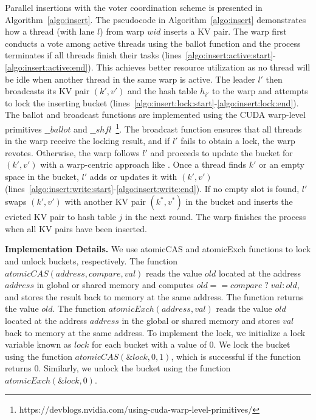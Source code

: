 Parallel insertions with the voter coordination scheme is presented in Algorithm~\ref{algo:insert}.
The pseudocode in Algorithm~\ref{algo:insert} demonstrates how a thread (with lane $l$) from warp $wid$ inserts a KV pair. 
The warp first conducts a vote among active threads using the ballot function and the process terminates if all threads finish their tasks (lines~\ref{algo:insert:active:start}-\ref{algo:insert:active:end}).  
This achieves better resource utilization as no thread will be idle when another thread in the same warp is active.  
The leader $l'$ then broadcasts its KV pair $(k',v')$ and the hash table $h_{i'}$ to the warp and attempts to lock the inserting bucket (lines~\ref{algo:insert:lock:start}-\ref{algo:insert:lock:end}). 
The ballot and broadcast functions are implemented using the CUDA warp-level primitives $\_\_ballot$ and $\_\_shfl$~\footnote{https://devblogs.nvidia.com/using-cuda-warp-level-primitives/}.
The broadcast function ensures that all threads in the warp receive the locking result, and if $l'$ fails to obtain a lock, the warp revotes.
Otherwise, the warp follows $l'$ and proceeds to update the bucket for $(k',v')$ with a warp-centric approach like .
Once a thread finds $k'$ or an empty space in the bucket, $l'$ adds or updates it with $(k',v')$ (lines~\ref{algo:insert:write:start}-\ref{algo:insert:write:end}).
If no empty slot is found, $l'$ swaps $(k',v')$ with another KV pair $(k^*,v^*)$ in the bucket and inserts the evicted KV pair to hash table $j$ in the next round. 
The warp finishes the process when all KV pairs have been inserted.

\vspace{1mm}
\noindent\textbf{Implementation Details.} We use atomicCAS and atomicExch functions to lock and unlock buckets, respectively.
The function $atomicCAS(address,compare,val)$ reads the value $old$ located at the address $address$ in global or shared memory and computes $old == compare \;?\; val : old$, and stores the result back to memory at the same address. The function returns the value $old$. The function $atomicExch(address,val)$ reads the value $old$ located at the address $address$ in the global or shared memory and stores $val$ back to memory at the same address. 
To implement the lock, we initialize a lock variable known as $lock$ for each bucket with a value of $0$. 
We lock the bucket using the function $atomicCAS(\&lock,0,1)$, which is successful if the function returns $0$.
Similarly, we unlock the bucket using the function $atomicExch(\&lock,0)$. 

